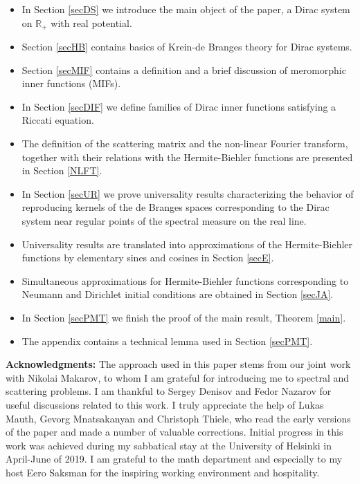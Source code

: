 \documentclass[11pt,twoside,reqno]{amsart}
\def\R{{\mathbb R}}
\theoremstyle{plain}
\numberwithin{equation}{section}
\begin{document}
\begin{itemize}


\item In Section \ref{secDS} we introduce the main object of the paper, a Dirac system on $\R_+$ with real potential.

\item Section \ref{secHB} contains basics of Krein-de Branges theory for Dirac systems.

\item Section \ref{secMIF} contains a definition and a brief discussion of meromorphic inner functions (MIFs).

\item In Section \ref{secDIF} we define families of Dirac inner functions satisfying a Riccati equation. 

\item The definition of the scattering matrix and the non-linear Fourier transform, together with their relations with
the Hermite-Biehler functions are presented in Section \ref{NLFT}.

\item In Section \ref{secUR} we prove universality results characterizing the behavior of reproducing kernels of the de Branges
spaces corresponding to the Dirac system near regular points of the spectral measure on the real line.

\item Universality results are translated into approximations of the Hermite-Biehler functions by elementary sines and cosines in Section \ref{secE}.

\item Simultaneous approximations for Hermite-Biehler functions corresponding to Neumann and Dirichlet initial conditions
are obtained in Section \ref{secJA}.


\item In Section \ref{secPMT} we finish the proof of the main result, Theorem \ref{main}.

\item The appendix contains a technical lemma used in Section \ref{secPMT}.


\end{itemize}

\textbf{Acknowledgments:} The approach used in this paper stems from our joint work with Nikolai Makarov, to whom I am grateful for introducing
me to  spectral and scattering problems. I am thankful to Sergey Denisov and Fedor Nazarov for useful discussions related to this work.
I truly appreciate  the help of Lukas Mauth, Gevorg Mnatsakanyan and Christoph Thiele, who read the early versions of the paper and made a number of valuable corrections.
Initial progress in this work was achieved during my sabbatical stay at the  University of Helsinki in April-June of 2019. I am grateful to the math department and especially to my host Eero Saksman for the inspiring working environment and hospitality. 
\end{document}
